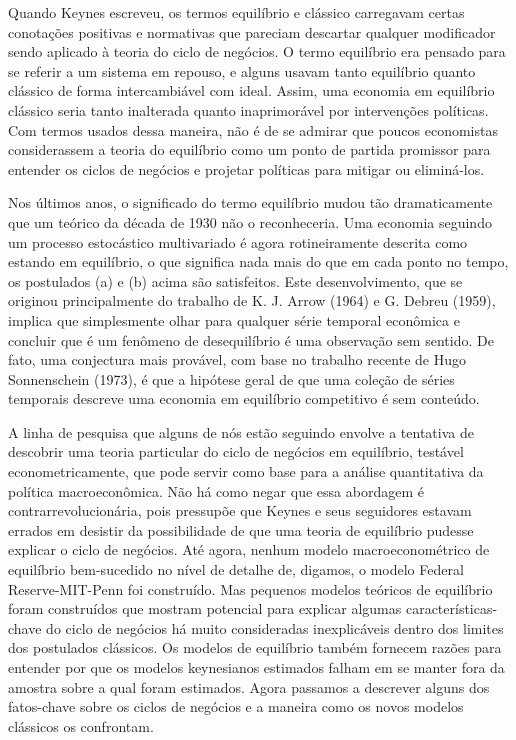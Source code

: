 \documentclass[a4paper,12pt]{article}[abntex2]
\begin{document}
Quando Keynes escreveu, os termos equilíbrio e clássico carregavam certas conotações positivas e normativas que pareciam descartar qualquer modificador sendo aplicado à teoria do ciclo de negócios. O termo equilíbrio era pensado para se referir a um sistema em repouso, e alguns usavam tanto equilíbrio quanto clássico de forma intercambiável com ideal. Assim, uma economia em equilíbrio clássico seria tanto inalterada quanto inaprimorável por intervenções políticas. Com termos usados dessa maneira, não é de se admirar que poucos economistas considerassem a teoria do equilíbrio como um ponto de partida promissor para entender os ciclos de negócios e projetar políticas para mitigar ou eliminá-los.

Nos últimos anos, o significado do termo equilíbrio mudou tão dramaticamente que um teórico da década de 1930 não o reconheceria. Uma economia seguindo um processo estocástico multivariado é agora rotineiramente descrita como estando em equilíbrio, o que significa nada mais do que em cada ponto no tempo, os postulados (a) e (b) acima são satisfeitos. Este desenvolvimento, que se originou principalmente do trabalho de K. J. Arrow (1964) e G. Debreu (1959), implica que simplesmente olhar para qualquer série temporal econômica e concluir que é um fenômeno de desequilíbrio é uma observação sem sentido. De fato, uma conjectura mais provável, com base no trabalho recente de Hugo Sonnenschein (1973), é que a hipótese geral de que uma coleção de séries temporais descreve uma economia em equilíbrio competitivo é sem conteúdo.

A linha de pesquisa que alguns de nós estão seguindo envolve a tentativa de descobrir uma teoria particular do ciclo de negócios em equilíbrio, testável econometricamente, que pode servir como base para a análise quantitativa da política macroeconômica. Não há como negar que essa abordagem é contrarrevolucionária, pois pressupõe que Keynes e seus seguidores estavam errados em desistir da possibilidade de que uma teoria de equilíbrio pudesse explicar o ciclo de negócios. Até agora, nenhum modelo macroeconométrico de equilíbrio bem-sucedido no nível de detalhe de, digamos, o modelo Federal Reserve-MIT-Penn foi construído. Mas pequenos modelos teóricos de equilíbrio foram construídos que mostram potencial para explicar algumas características-chave do ciclo de negócios há muito consideradas inexplicáveis dentro dos limites dos postulados clássicos. Os modelos de equilíbrio também fornecem razões para entender por que os modelos keynesianos estimados falham em se manter fora da amostra sobre a qual foram estimados. Agora passamos a descrever alguns dos fatos-chave sobre os ciclos de negócios e a maneira como os novos modelos clássicos os confrontam.
\end{document}
